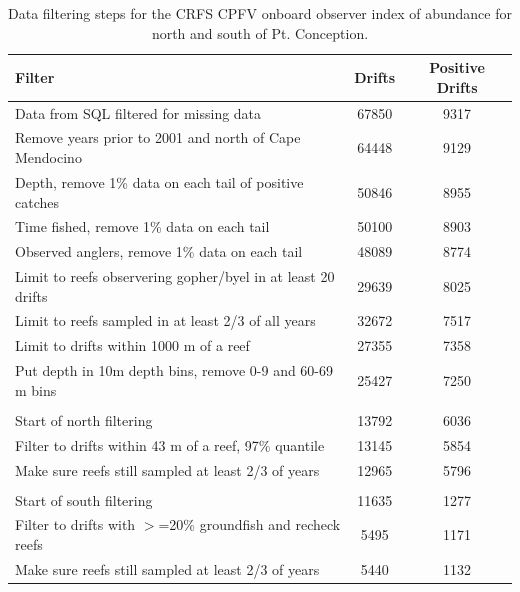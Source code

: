 \documentclass[12pt,]{article}
\begin{document}
\begin{table}[ht]
\centering
\caption{Data filtering steps for the CRFS CPFV onboard observer 
                                        index of abundance for north and south of Pt. Conception.} 
\label{tab:Fleet6_7_Filter}
\begin{tabular}{lcc}
  \hline
Filter & Drifts & Positive Drifts \\ 
  \hline
Data from SQL filtered for missing data & 67850 & 9317 \\ 
  Remove years prior to 2001 and north of Cape Mendocino & 64448 & 9129 \\ 
  Depth, remove 1\% data on each tail of positive catches & 50846 & 8955 \\ 
  Time fished, remove 1\% data on each tail & 50100 & 8903 \\ 
  Observed anglers, remove 1\% data on each tail & 48089 & 8774 \\ 
  Limit to reefs observering gopher/byel in at least 20 drifts & 29639 & 8025 \\ 
  Limit to reefs sampled in at least 2/3 of all years & 32672 & 7517 \\ 
  Limit to drifts within 1000 m of a reef & 27355 & 7358 \\ 
  Put depth in 10m depth bins, remove 0-9 and 60-69 m bins & 25427 & 7250 \\ 
   &  &  \\ 
  Start of north filtering & 13792 & 6036 \\ 
  Filter to drifts within 43 m of a reef, 97\% quantile & 13145 & 5854 \\ 
  Make sure reefs still sampled at least 2/3 of years & 12965 & 5796 \\ 
   &  &  \\ 
  Start of south filtering & 11635 & 1277 \\ 
  Filter to drifts with $>$=20\% groundfish and recheck reefs & 5495 & 1171 \\ 
  Make sure reefs still sampled at least 2/3 of years & 5440 & 1132 \\ 
   \hline
\end{tabular}
\end{table}

\clearpage
\newpage
\end{document}
